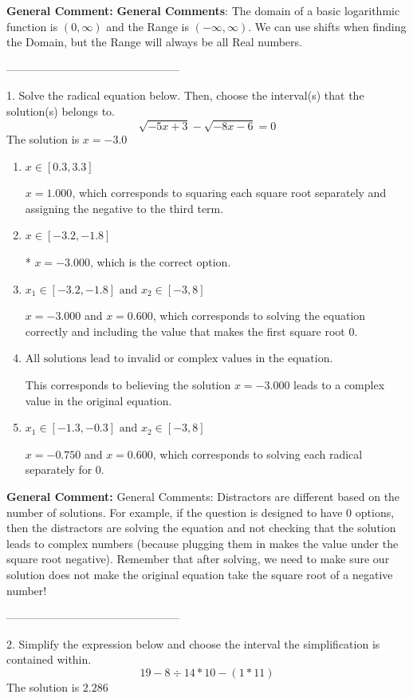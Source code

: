 \documentclass{extbook}[14pt]
\begin{document}
\textbf{General Comment:} \textbf{General Comments}: The domain of a basic logarithmic function is $(0, \infty)$ and the Range is $(-\infty, \infty)$. We can use shifts when finding the Domain, but the Range will always be all Real numbers. 

-----------------------------------------------

1. Solve the radical equation below. Then, choose the interval(s) that the solution(s) belongs to.
\[ \sqrt{-5 x + 3} - \sqrt{-8 x - 6} = 0 \] 
The solution is $ x = -3.0 $ 

\begin{enumerate}[label=\Alph*.] 
\item $ x \in [0.3,3.3] $ 

 $x = 1.000$, which corresponds to squaring each square root separately and assigning the negative to the third term. 
\item $ x \in [-3.2,-1.8] $ 

 * $x = -3.000$, which is the correct option. 
\item $ x_1 \in [-3.2, -1.8] \text{ and } x_2 \in [-3,8] $ 

 $x = -3.000$ and $x = 0.600$, which corresponds to solving the equation correctly and including the value that makes the first square root 0. 
\item $ \text{All solutions lead to invalid or complex values in the equation.} $ 

 This corresponds to believing the solution $x = -3.000$ leads to a complex value in the original equation. 
\item $ x_1 \in [-1.3, -0.3] \text{ and } x_2 \in [-3,8] $ 

 $x = -0.750$ and $x = 0.600$, which corresponds to solving each radical separately for 0. 
\end{enumerate} 
 
\textbf{General Comment:} General Comments: Distractors are different based on the number of solutions. For example, if the question is designed to have 0 options, then the distractors are solving the equation and not checking that the solution leads to complex numbers (because plugging them in makes the value under the square root negative). Remember that after solving, we need to make sure our solution does not make the original equation take the square root of a negative number! 

-----------------------------------------------

2. Simplify the expression below and choose the interval the simplification is contained within.
\[ 19 - 8 \div 14 * 10 - (1 * 11) \] 
The solution is $ 2.286 $ 
\end{document}
